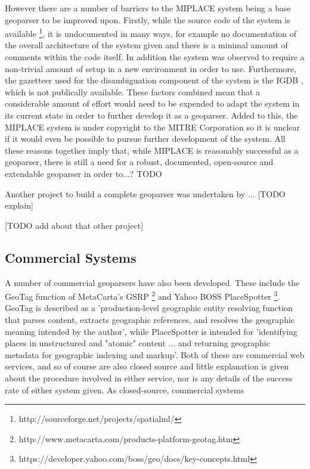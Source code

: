 \documentclass[12pt, a4paper]{report}
\begin{document}
However there are a number of barriers to the MIPLACE system being a base geoparser to be improved upon. Firstly, while the source code of the system is available \footnote{http://sourceforge.net/projects/spatialml/}, it is undocumented in many ways, for example no documentation of the overall architecture of the system given and there is a minimal amount of comments within the code itself. In addition the system was observed to require a non-trivial amount of setup in a new environment in order to use. Furthermore, the gazetteer used for the disambiguation component of the system is the IGDB \citep{igdb2005}, which is not publically available. These factors combined mean that a considerable amount of effort would need to be expended to adapt the system in its current state in order to further develop it as a geoparser. Added to this, the MIPLACE system is under copyright to the MITRE Corporation so it is unclear if it would even be possible to pursue further development of the system. All these reasons together imply that, while MIPLACE is reasonably successful as a geoparser, there is still a need for a robust, documented, open-source and extendable geoparser in order to...? TODO

Another project to build a complete geoparser was undertaken by \citet{tobin2010}... [TODO explain]

[TODO add about that other project]

\subsection{Commercial Systems}

A number of commercial geoparsers have also been developed. These include the GeoTag function of MetaCarta's GSRP \footnote{http://www.metacarta.com/products-platform-geotag.htm} and Yahoo BOSS PlaceSpotter \footnote{https://developer.yahoo.com/boss/geo/docs/key-concepts.html}. GeoTag is described as a 'production-level geographic entity resolving function that parses content, extracts geographic references, and resolves the geographic meaning intended by the author', while PlaceSpotter is intended for 'identifying places in unstructured and "atomic" content ... and returning geographic metadata for geographic indexing and markup'. Both of these are commercial web services, and so of course are also closed source and little explanation is given about the procedure involved in either service, nor is any details of the success rate of either system given. As closed-source, commercial systems 
 
\end{document}
